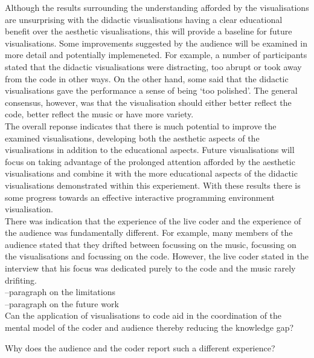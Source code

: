 \documentclass[12pt]{article}
\begin{document}
Although the results surrounding the understanding afforded by the visualisations are unsurprising with the didactic visualisations having a clear educational benefit over the aesthetic visualisations, this will provide a baseline for future visualisations. Some improvements suggested by the audience will be examined in more detail and potentially implemeneted. For example, a number of participants stated that the didactic visualisations were distracting, too abrupt or took away from the code in other ways. On the other hand, some said that the didactic visualisations gave the performance a sense of being `too polished'. The general consensus, however, was that the visualisation should either better reflect the code, better reflect the music or have more variety.\\

The overall reponse indicates that there is much potential to improve the examined visualisations, developing both the aesthetic aspects of the visualisations in addition to the educational aspects. Future visualisations will focus on taking advantage of the prolonged attention afforded by the aesthetic visualisations and combine it with the more educational aspects of the didactic visualisations demonstrated within this experiement. With these results there is some progress towards an effective interactive programming environment visualisation.\\

There was indication that the experience of the live coder and the experience of the audience was fundamentally different. For example, many members of the audience stated that they drifted between focussing on the music, focussing on the visualisations and focussing on the code. However, the live coder stated in the interview that his focus was dedicated purely to the code and the music rarely drifiting.\\



--paragraph on the limitations\\

--paragraph on the future work\\





Can the application of visualisations to code aid in the coordination of the mental model of the coder and audience thereby reducing the knowledge gap?

Why does the audience and the coder report such a different experience?
\end{document}
